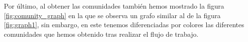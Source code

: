 Por último, al obtener las comunidades también hemos mostrado la figura \ref{fig:comunity_graph} en la que se observa un grafo similar al de la figura \ref{fig:graph1}, sin embargo, en este tenemos diferenciadas por colores las diferentes comunidades que hemos obtenido tras realizar el flujo de trabajo.

\begin{minipage}{\linewidth}
	\label{fig:comunity_graph}
\end{minipage}
